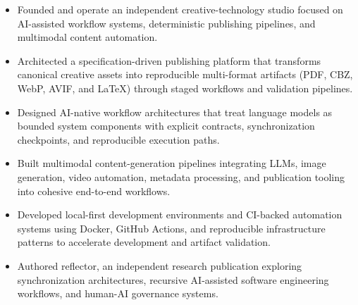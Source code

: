 \begin{itemize}
\item Founded and operate an independent creative-technology studio focused on AI-assisted workflow systems, deterministic publishing pipelines, and multimodal content automation.
\item Architected a specification-driven publishing platform that transforms canonical creative assets into reproducible multi-format artifacts (PDF, CBZ, WebP, AVIF, and LaTeX) through staged workflows and validation pipelines.
\item Designed AI-native workflow architectures that treat language models as bounded system components with explicit contracts, synchronization checkpoints, and reproducible execution paths.
\item Built multimodal content-generation pipelines integrating LLMs, image generation, video automation, metadata processing, and publication tooling into cohesive end-to-end workflows.
\item Developed local-first development environments and CI-backed automation systems using Docker, GitHub Actions, and reproducible infrastructure patterns to accelerate development and artifact validation.
\item Authored reflector, an independent research publication exploring synchronization architectures, recursive AI-assisted software engineering workflows, and human-AI governance systems.
\end{itemize}
